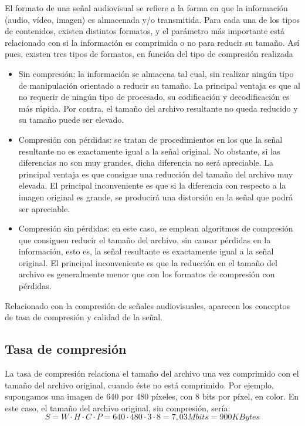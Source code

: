 \documentclass[es,practica]{uah}
\begin{document}
El formato de una señal audiovisual se refiere a la forma en que la información (audio, vídeo, imagen) es almacenada y/o transmitida. Para cada una de los tipos de contenidos, existen distintos formatos, y el parámetro más importante está relacionado con si la información es comprimida o no para reducir su tamaño. Así pues, existen tres tipos de formatos, en función del tipo de compresión realizada
\begin{itemize}
	\item Sin compresión: la información se almacena tal cual, sin realizar ningún tipo de manipulación orientado a reducir su tamaño. La principal ventaja es que al no requerir de ningún tipo de procesado, su codificación y decodificación es más rápida. Por contra, el tamaño del archivo resultante no queda reducido y su tamaño puede ser elevado.
	\item Compresión con pérdidas: se tratan de procedimientos en los que la señal resultante no es exactamente igual a la señal original. No obstante, si las diferencias no son muy grandes, dicha diferencia no será apreciable. La principal ventaja es que consigue una reducción del tamaño del archivo muy elevada. El principal inconveniente es que si la diferencia con respecto a la imagen original es grande, se producirá una distorsión en la señal que podrá ser apreciable.
	\item Compresión sin pérdidas: en este caso, se emplean algoritmos de compresión que consiguen reducir el tamaño del archivo, sin causar pérdidas en la información, esto es, la señal resultante es exactamente igual a la señal original. El principal inconveniente es que la reducción en el tamaño del archivo es generalmente menor que con los formatos de compresión con pérdidas.
\end{itemize}

Relacionado con la compresión de señales audiovisuales, aparecen los conceptos de tasa de compresión y calidad de la señal.

\subsection{Tasa de compresión}

La tasa de compresión relaciona el tamaño del archivo una vez comprimido con el tamaño del archivo original, cuando éste no está comprimido. Por ejemplo, supongamos una imagen de 640 por 480 píxeles, con 8 bits por píxel, en color. En este caso, el tamaño del archivo original, sin compresión, sería:
\begin{displaymath}
	S=W\cdot H\cdot C\cdot P=640\cdot 480\cdot 3\cdot 8=7,03 Mbits=900 KBytes
\end{displaymath}
\end{document}
